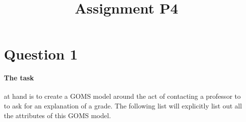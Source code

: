 

\title{Assignment P4\\}



\maketitle
\thispagestyle{fancy}

\section{Question 1}

\paragraph{The task} at hand is to create a GOMS model around the act of contacting a professor to to ask for an explanation of a grade. The following list will explicitly list out all the attributes of this GOMS model.


